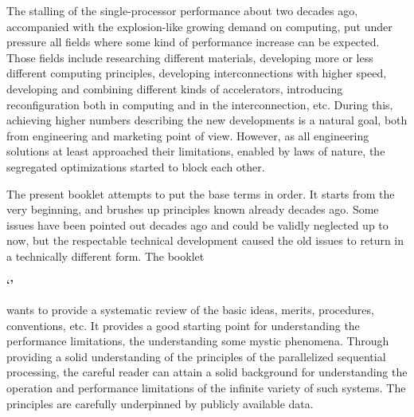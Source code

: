 The stalling of the single-processor performance about two decades ago,
accompanied with the explosion-like growing demand on computing, put under
pressure all fields where some kind of performance increase can be expected.
Those fields include researching different materials, developing more or less different computing principles, developing interconnections with higher speed, developing and combining 
different kinds of accelerators, introducing reconfiguration both in computing and
in the interconnection, etc. 
During this, achieving higher numbers describing the new developments is a natural goal,
both from engineering and marketing point of view. However, as all engineering solutions
at least approached their limitations, enabled by laws of nature, the segregated
optimizations started to block each other. 

The present booklet attempts to put the base terms in order. It starts from the very beginning,
and brushes up principles known already decades ago. Some issues have been pointed out decades ago
and could be validly neglected up to now, but the respectable technical development 
caused the old issues to return in a technically different form. The booklet

\begin{center}
\huge\bfseries\sffamily\color{lime}`\LectureTitle'
\end{center}

wants to provide a systematic review of the basic ideas, merits, procedures, conventions, etc.
It provides a good starting point for understanding the performance limitations,
the understanding some mystic phenomena. Through providing a solid understanding
of the principles of the parallelized sequential processing, the careful reader can attain
a solid background for understanding the operation and performance limitations
of the infinite variety of such systems. The principles are carefully underpinned by
publicly available data.
